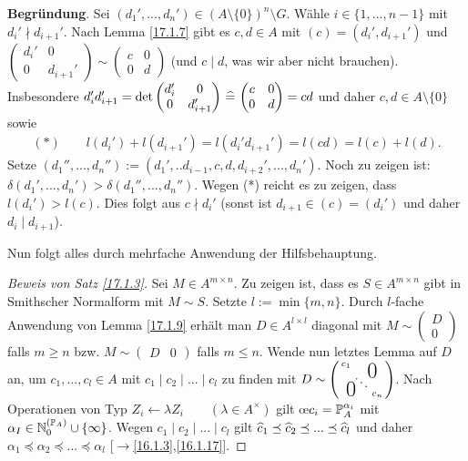 \documentclass[../../main.tex]{subfiles}
\begin{document}
\begin{cproof}
\begin{tcolorbox}[arc=0mm, boxrule=0.2mm]
\noindent\textbf{Begründung}. Sei $(d_1',...,d_n')\in (A\setminus\{0\})^n\setminus G$. Wähle $i\in\{1,...,n-1\}$ mit $d_i'\nmid d_{i+1}'$. Nach Lemma \ref{17.1.7} gibt es $c,d\in A$ mit $(c)=(d_i',d_{i+1}')$ und $\begin{pmatrix*}d_i'&0\\ 0&d_{i+1}'\end{pmatrix*}\sim\begin{pmatrix*}c&0\\ 0&d\end{pmatrix*}$ (und $c\mid d$, was wir aber nicht brauchen). Insbesondere $d_i'd_{i+1}'=\det\begin{pmatrix*}d_i'&0\\ 0&d_{i+1}'\end{pmatrix*}\divi\begin{pmatrix*}c&0\\ 0&d\end{pmatrix*}=cd$ und daher $c,d\in A\setminus\{0\}$ sowie
\begin{align*}
(*)\qquad l(d_i')+l(d_{i+1}')=l(d_i'd_{i+1}')=l(cd)=l(c)+l(d).
\end{align*}
Setze $(d_1'',...,d_n''):=(d_1',..d_{i-1},c,d,d_{i+2}',...,d_n')$. Noch zu zeigen ist: $\delta(d_1',...,d_n')>\delta(d_1'',...,d_n'')$. Wegen (*) reicht es zu zeigen, dass $l(d_i')>l(c)$. Dies folgt aus $c\nmid d_i'$ (sonst ist $d_{i+1}\in (c)=(d_i')$ und daher $d_i\mid d_{i+1}$).\end{tcolorbox}

\noindent Nun folgt alles durch mehrfache Anwendung der Hilfsbehauptung.
\end{cproof}

\begin{proof}[Beweis von Satz \ref{17.1.3}]
Sei $M\in A^{m\times n}$. Zu zeigen ist, dass es $S\in A^{m\times n}$ gibt in Smithscher Normalform mit $M\sim S$. Setzte $l:=\min\{m,n\}$. Durch $l$-fache Anwendung von Lemma \ref{17.1.9} erhält man $D\in A^{l\times l}$ diagonal mit $M\sim\begin{pmatrix}D\\0\end{pmatrix}$ falls $m\ge n$ bzw. $M\sim \begin{pmatrix}D&0\end{pmatrix}$ falls $m\le n$. Wende nun letztes Lemma auf $D$ an, um $c_1,...,c_l\in A$ mit $c_1\mid c_2\mid...\mid c_l$ zu finden mit $D\sim \left(\begin{smallmatrix}
c_1 & & \llap{$\overset{\blap{\LARGE 0}}{~}$} \\
& \ddots &\\
\rlap{\tlap{\LARGE 0}} & & c_n
\end{smallmatrix}\right)$. Nach Operationen von Typ $Z_i\leftarrow \lambda Z_i\qquad (\lambda\in A^\times)$ gilt \oe $c_i=\P_A^{\alpha_i}$ mit $\alpha_I\in \expfam\cup\{\infty\}$. Wegen $c_1\mid c_2\mid...\mid c_l$ gilt $\tc c_1\preceq \tc c_2\preceq...\preceq \tc c_l$ und daher $\alpha_1\preceq \alpha_2\preceq...\preceq \alpha_l$ [$\to$\ref{16.1.3},\ref{16.1.17}].
\end{proof}
\end{document}
